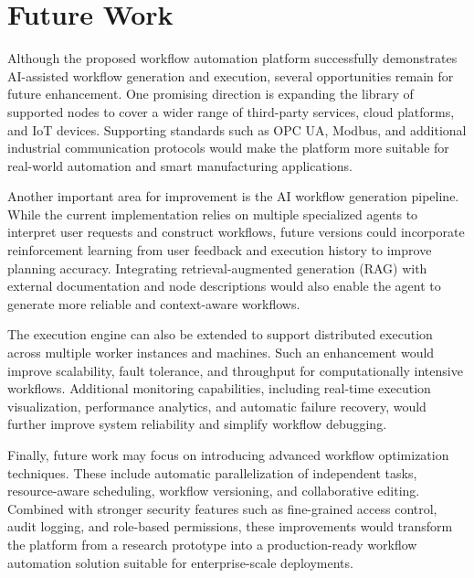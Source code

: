 \chapter{Future Work}

Although the proposed workflow automation platform successfully demonstrates AI-assisted workflow generation and execution, several opportunities remain for future enhancement. One promising direction is expanding the library of supported nodes to cover a wider range of third-party services, cloud platforms, and IoT devices. Supporting standards such as OPC UA, Modbus, and additional industrial communication protocols would make the platform more suitable for real-world automation and smart manufacturing applications.

Another important area for improvement is the AI workflow generation pipeline. While the current implementation relies on multiple specialized agents to interpret user requests and construct workflows, future versions could incorporate reinforcement learning from user feedback and execution history to improve planning accuracy. Integrating retrieval-augmented generation (RAG) with external documentation and node descriptions would also enable the agent to generate more reliable and context-aware workflows.

The execution engine can also be extended to support distributed execution across multiple worker instances and machines. Such an enhancement would improve scalability, fault tolerance, and throughput for computationally intensive workflows. Additional monitoring capabilities, including real-time execution visualization, performance analytics, and automatic failure recovery, would further improve system reliability and simplify workflow debugging.

Finally, future work may focus on introducing advanced workflow optimization techniques. These include automatic parallelization of independent tasks, resource-aware scheduling, workflow versioning, and collaborative editing. Combined with stronger security features such as fine-grained access control, audit logging, and role-based permissions, these improvements would transform the platform from a research prototype into a production-ready workflow automation solution suitable for enterprise-scale deployments.